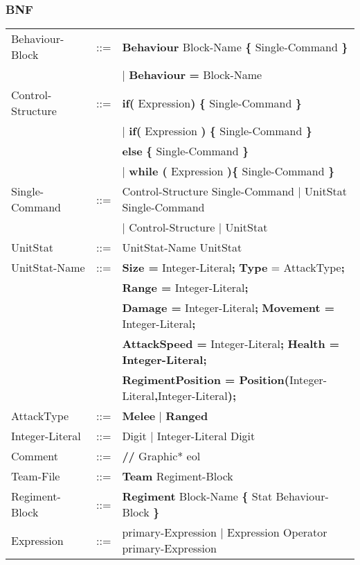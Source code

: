 	\subsubsection{BNF}
		\begin{tabular}{ l l l }
			Behaviour-Block	   &	::=	 & {\bf Behaviour} Block-Name {\bf \{} Single-Command {\bf \}}  \\
							   &         & $\mid$ {\bf Behaviour} {\bf = } Block-Name \\
			Control-Structure  &  	::=  & {\bf if( } Expression{\bf )} {\bf \{ } Single-Command {\bf \} }  \\
							   &		 & $\mid$ {\bf if(} Expression {\bf )} {\bf \{ }Single-Command {\bf \}} \\
							   &   		 & {\bf else } {\bf \{ }Single-Command {\bf \} } \\					   
							   &   		 & $\mid$ {\bf while (} Expression {\bf )}{\bf \{ } Single-Command {\bf \}} \\
			Single-Command     &	::=  & Control-Structure Single-Command $\mid$ UnitStat Single-Command \\
							   &		 & $\mid$ Control-Structure $\mid$ UnitStat					\\
			UnitStat		   &	::=  & UnitStat-Name UnitStat \\
			UnitStat-Name	   &	::=	 & {\bf Size =} Integer-Literal{\bf ;} {\bf Type} = AttackType{\bf ;} \\
							   &	     & {\bf  Range =} Integer-Literal{\bf;} \\
							   &	     & {\bf Damage =} Integer-Literal{\bf ;} {\bf Movement = }Integer-Literal{\bf ;} \\
							   &		 & {\bf AttackSpeed = }Integer-Literal{\bf ;} {\bf Health  = Integer-Literal;} \\
							   &		 & {\bf RegimentPosition = Position(}Integer-Literal{\bf ,}Integer-Literal{\bf );} \\
			AttackType		   &    ::=  & {\bf Melee} $\mid$ {\bf Ranged} \\
			Integer-Literal    &	::=  & Digit $\mid$ Integer-Literal Digit \\
			Comment			   &	::=	 & {\bf //} Graphic* eol \\
			Team-File		   &	::=	 & {\bf Team} Regiment-Block \\
			Regiment-Block     &	::=	 & {\bf Regiment} Block-Name {\bf \{ } Stat Behaviour-Block \bf{\} }\\
			Expression 		   &	::=	 & primary-Expression $\mid$ Expression Operator primary-Expression \\

\end{tabular}
